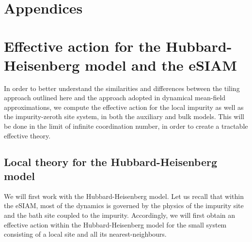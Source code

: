 \documentclass[reprint,hidelinks,onecolumn]{revtex4-2}
\begin{document}
\clearpage
\section*{Appendices}
\appendix
\section{Effective action for the Hubbard-Heisenberg model and the eSIAM}
In order to better understand the similarities and differences between the tiling approach outlined here and the approach adopted in dynamical mean-field approximations, we compute the effective action for the local impurity as well as the impurity-zeroth site system, in both the auxiliary and bulk models. This will be done in the limit of infinite coordination number, in order to create a tractable effective theory.

\subsection{Local theory for the Hubbard-Heisenberg model}
We will first work with the Hubbard-Heisenberg model. Let us recall that within the eSIAM, most of the dynamics is governed by the physics of the impurity site and the bath site coupled to the impurity. Accordingly, we will first obtain an effective action within the Hubbard-Heisenberg model for the small system consisting of a local site and all its nearest-neighbours. 
\end{document}
